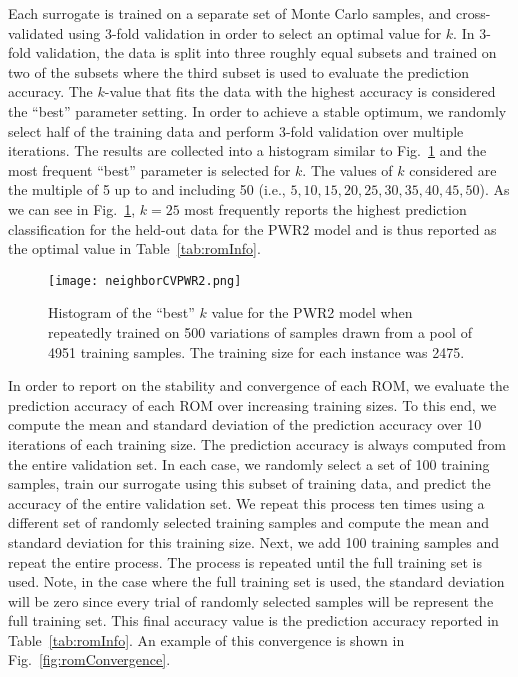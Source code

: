 Each surrogate is trained on a separate set of Monte Carlo samples, and cross-validated using 3-fold validation in order to select an optimal value for $k$.
%
In 3-fold validation, the data is split into three roughly equal subsets and trained on two of the subsets where the third subset is used to evaluate the prediction accuracy.
%
The $k$-value that fits the data with the highest accuracy is considered the ``best'' parameter setting.
%
In order to achieve a stable optimum, we randomly select half of the training data and perform 3-fold validation over multiple iterations.
%
The results are collected into a histogram similar to Fig.~\ref{fig:neighborSelection} and the most frequent ``best'' parameter is selected for $k$.
%
The values of $k$ considered are the multiple of 5 up to and including 50 (i.e., $5,10,15,20,25,30,35,40,45,50$).
%
As we can see in Fig.~\ref{fig:neighborSelection}, $k=25$ most frequently reports the highest prediction classification for the held-out data for the PWR2 model and is thus reported as the optimal
value in Table~\ref{tab:romInfo}.

\begin{figure}[!htbp]
	\centering
	\texttt{[image: neighborCVPWR2.png]}
	\caption{Histogram of the ``best'' $k$ value for the PWR2 model when repeatedly trained on 500 variations of samples drawn from a pool of 4951 training samples. The training size for each instance was 2475.}
	\label{fig:neighborSelection}
\end{figure}

In order to report on the stability and convergence of each ROM, we evaluate the prediction accuracy of each ROM over increasing training sizes.
%
To this end, we compute the mean and standard deviation of the prediction accuracy over 10 iterations of each training size.
%
The prediction accuracy is always computed from the entire validation set.
%
In each case, we randomly select a set of 100 training samples, train our surrogate using this subset of training data, and predict the accuracy of the entire validation set.
%
We repeat this process ten times using a different set of randomly selected training samples and compute the mean and standard deviation for this training size.
%
Next, we add 100 training samples and repeat the entire process.
%
The process is repeated until the full training set is used.
%
Note, in the case where the full training set is used, the standard deviation will be zero since every trial of randomly selected samples will be represent the full training set.
%
This final accuracy value is the prediction accuracy reported in Table~\ref{tab:romInfo}.
%
An example of this convergence is shown in Fig.~\ref{fig:romConvergence}.

